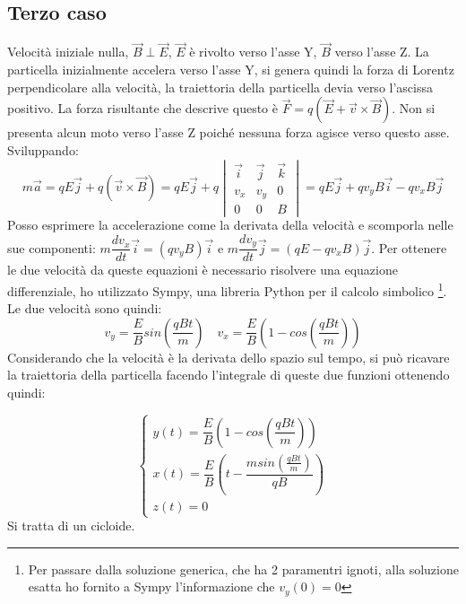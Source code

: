 \documentclass[dvips]{article}
\begin{document}
\subsection{Terzo caso}
Velocità iniziale nulla, $\Vec{B} \perp \Vec{E}$,  $\Vec{E}$ è rivolto verso l'asse Y, $\Vec{B}$ verso l'asse Z.
La particella inizialmente accelera verso l'asse Y, si genera quindi la forza di Lorentz perpendicolare alla velocità, la traiettoria della particella devia verso l'ascissa positivo. La forza risultante che descrive questo è $\Vec{F} = q(\Vec{E}+\Vec{v}\times\Vec{B})$. Non si presenta alcun moto verso l'asse Z poiché nessuna forza agisce verso questo asse.
Sviluppando:  
\[m\Vec{a} = qE\Vec{j} + q(\Vec{v}\times\Vec{B}) = qE\Vec{j} + q
\begin{vmatrix}
\Vec{i} & \Vec{j} & \Vec{k}\\
v_x & v_y & 0\\
0 & 0 & B
\end{vmatrix} = qE\Vec{j} + qv_yB\Vec{i} -qv_xB\Vec{j}
\]
Posso esprimere la accelerazione come la derivata della velocità e scomporla nelle sue componenti: $m\dfrac{dv_x}{dt}\Vec{i} = (qv_yB)\Vec{i}$ e $m\dfrac{dv_y}{dt}\Vec{j} = (qE - qv_xB)\Vec{j}$.
Per ottenere le due velocità da queste equazioni è necessario risolvere una equazione differenziale, ho utilizzato Sympy, una libreria Python per il calcolo simbolico \footnote{Per passare dalla soluzione generica, che ha 2 paramentri ignoti, alla soluzione esatta ho fornito a Sympy l'informazione che $v_y(0) = 0$ }. Le due velocità sono quindi:
\[
v_y = \dfrac{E}{B}sin(\dfrac{qBt}{m}) \quad v_x = \dfrac{E}{B}(1-cos(\dfrac{qBt}{m}))
\]
Considerando che la velocità è la derivata dello spazio sul tempo, si può ricavare la traiettoria della particella facendo l'integrale di queste due funzioni ottenendo quindi:

\begin{equation}
    \begin{cases}
      y(t) = \dfrac{E}{B}(1-cos(\dfrac{qBt}{m}))\\
      x(t) = \dfrac{E}{B}(t-\dfrac{msin(\tfrac{qBt}{m})}{qB})\\
      z(t) = 0
    \end{cases}
\end{equation}
Si tratta di un cicloide.

\begin{figure}[h!]
    \begin{center}
    \end{center}
\end{figure}
\end{document}
